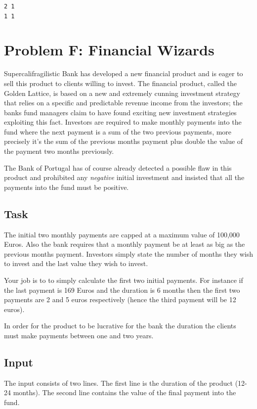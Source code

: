 \documentclass[11pt]{report}
\begin{document}
\begin{verbatim}
2 1
1 1
\end{verbatim}

\clearpage

\section*{Problem F: Financial Wizards}

Supercalifragilistic Bank has developed a new financial product and is eager to sell this product to clients willing to invest. The financial product, called the Golden Lattice, is based on a new and extremely cunning investment strategy  that relies on a specific and predictable revenue income from the investors; the banks fund managers claim to have found exciting new investment strategies exploiting this fact. Investors are required to make monthly payments into the fund where the next payment is a sum of the two previous payments,  more precisely it's the sum of the previous months payment plus double the value of the payment two months previously.

The Bank of Portugal has of course already detected a possible flaw in this product and prohibited any \textit{negative} initial investment and insisted that all the payments into the fund must be positive.

\subsection*{Task}

The initial two monthly payments are capped at a maximum value of 100,000 Euros. Also the bank requires that a monthly payment be at least as big as the previous months payment.  Investors simply state the number of months they wish to invest  and the last value they wish to invest.

Your job is to  to simply calculate the first two initial payments. For instance if the last payment is 169 Euros and the duration is 6 months then the first two payments are 2 and 5 euros respectively (hence the third payment will be 12 euros).

In order for the product to be lucrative for the bank the duration the clients must make payments between one and two years.

\subsection*{Input}
The input consists of two lines. The first line is the duration of the product (12-24 months). The second line contains the value of the final payment into the fund.
\end{document}
